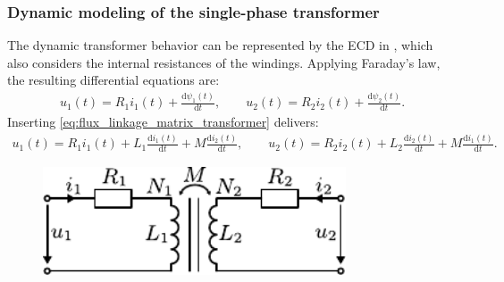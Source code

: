 \begin{frame}
\begin{columns}
\begin{column}{0.525\textwidth}
\begin{figure}
			\end{figure}
		\end{column}
		\end{columns}
\end{frame}

\begin{frame}
	\frametitle{Dynamic modeling of the single-phase transformer}
		The dynamic transformer behavior can be represented by the ECD in , which also considers the internal resistances of the windings. Applying Faraday's law, the resulting differential equations are:
		\begin{align}
			u_1(t) = R_1 i_1(t) + \frac{\mathrm{d}\psi_1(t)}{\mathrm{d}t}, \qquad u_2(t) = R_2 i_2(t) + \frac{\mathrm{d}\psi_2(t)}{\mathrm{d}t}. \label{eq:transformer_differential_equations}
		\end{align} \pause
		Inserting \eqref{eq:flux_linkage_matrix_transformer} delivers:
		\begin{align}
			u_1(t) = R_1 i_1(t) + L_1 \frac{\mathrm{d}i_1(t)}{\mathrm{d}t} + M \frac{\mathrm{d}i_2(t)}{\mathrm{d}t}, \qquad
			u_2(t) = R_2 i_2(t) + L_2 \frac{\mathrm{d}i_2(t)}{\mathrm{d}t} + M \frac{\mathrm{d}i_1(t)}{\mathrm{d}t}. \label{eq:transformer_differential_equations_2}
		\end{align}
\begin{figure}
\begin{columns}
	\begin{column}{0.55\textwidth}
            \centering
            \includegraphics[width=0.8\textwidth]{fig/lec04/General_transformer_ECD.pdf}
    \end{column}
\end{columns}
\end{figure}
\end{frame}

